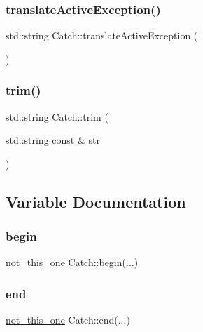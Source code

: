 \subsubsection{\texorpdfstring{translate\+Active\+Exception()}{translateActiveException()}}
{\footnotesize\ttfamily std\+::string Catch\+::translate\+Active\+Exception (\begin{DoxyParamCaption}{ }\end{DoxyParamCaption})}

\mbox{\label{namespace_catch_a084108b47f37d8bfd5db51c50c7451b3}} 
\subsubsection{\texorpdfstring{trim()}{trim()}}
{\footnotesize\ttfamily std\+::string Catch\+::trim (\begin{DoxyParamCaption}\item[{std\+::string const \&}]{str }\end{DoxyParamCaption})}



\subsection{Variable Documentation}
\mbox{\label{namespace_catch_ac7ccff5c186bffa3b448b218ecf15956}} 
\subsubsection{\texorpdfstring{begin}{begin}}
{\footnotesize\ttfamily \mbox{\hyperlink{struct_catch_1_1not__this__one}{not\+\_\+this\+\_\+one}} Catch\+::begin(...)}

\mbox{\label{namespace_catch_a71fef6a57614eb2d9751f8586ff6de6a}} 
\subsubsection{\texorpdfstring{end}{end}}
{\footnotesize\ttfamily \mbox{\hyperlink{struct_catch_1_1not__this__one}{not\+\_\+this\+\_\+one}} Catch\+::end(...)}

